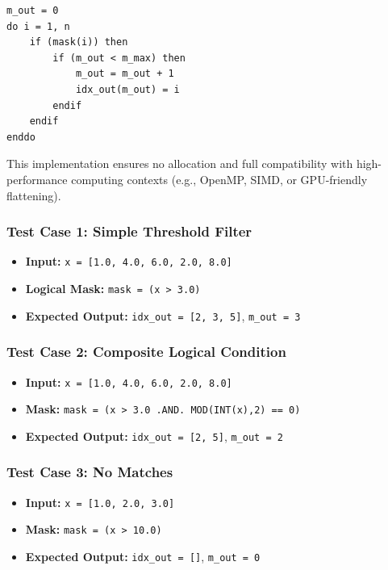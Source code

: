 \documentclass{article}
\begin{document}
\begin{verbatim}
m_out = 0
do i = 1, n
    if (mask(i)) then
        if (m_out < m_max) then
            m_out = m_out + 1
            idx_out(m_out) = i
        endif
    endif
enddo
\end{verbatim}

This implementation ensures no allocation and full compatibility with high-performance computing contexts (e.g., OpenMP, SIMD, or GPU-friendly flattening).

\subsubsection{Test Case 1: Simple Threshold Filter}

\begin{itemize}
  \item \textbf{Input:} \texttt{x = [1.0, 4.0, 6.0, 2.0, 8.0]}
  \item \textbf{Logical Mask:} \texttt{mask = (x > 3.0)}
  \item \textbf{Expected Output:} \texttt{idx\_out = [2, 3, 5]}, \texttt{m\_out = 3}
\end{itemize}

\subsubsection{Test Case 2: Composite Logical Condition}

\begin{itemize}
  \item \textbf{Input:} \texttt{x = [1.0, 4.0, 6.0, 2.0, 8.0]}
  \item \textbf{Mask:} \texttt{mask = (x > 3.0 .AND. MOD(INT(x),2) == 0)}
  \item \textbf{Expected Output:} \texttt{idx\_out = [2, 5]}, \texttt{m\_out = 2}
\end{itemize}

\subsubsection{Test Case 3: No Matches}

\begin{itemize}
  \item \textbf{Input:} \texttt{x = [1.0, 2.0, 3.0]}
  \item \textbf{Mask:} \texttt{mask = (x > 10.0)}
  \item \textbf{Expected Output:} \texttt{idx\_out = []}, \texttt{m\_out = 0}
\end{itemize}
\end{document}
